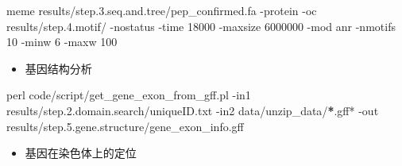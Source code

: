 \documentclass[
  10pt,
]{book}
\newenvironment{Shaded}{\begin{snugshade}}{\end{snugshade}}
\newcommand{\DecValTok}[1]{\textcolor[rgb]{0.00,0.00,0.81}{#1}}
\newcommand{\ErrorTok}[1]{\textcolor[rgb]{0.64,0.00,0.00}{\textbf{#1}}}
\newcommand{\FloatTok}[1]{\textcolor[rgb]{0.00,0.00,0.81}{#1}}
\newcommand{\NormalTok}[1]{#1}
\newcommand{\SpecialCharTok}[1]{\textcolor[rgb]{0.00,0.00,0.00}{#1}}
\providecommand{\tightlist}{%
  \setlength{\itemsep}{0pt}\setlength{\parskip}{0pt}}
\begin{document}
\begin{Shaded}
\begin{Highlighting}[]
\NormalTok{meme results}\SpecialCharTok{/}\NormalTok{step.}\FloatTok{3.}\NormalTok{seq.and.tree}\SpecialCharTok{/}\NormalTok{pep\_confirmed.fa }\SpecialCharTok{{-}}\NormalTok{protein }\SpecialCharTok{{-}}\NormalTok{oc results}\SpecialCharTok{/}\NormalTok{step.}\FloatTok{4.}\NormalTok{motif}\SpecialCharTok{/} \SpecialCharTok{{-}}\NormalTok{nostatus }\SpecialCharTok{{-}}\NormalTok{time }\DecValTok{18000} \SpecialCharTok{{-}}\NormalTok{maxsize }\DecValTok{6000000} \SpecialCharTok{{-}}\NormalTok{mod anr }\SpecialCharTok{{-}}\NormalTok{nmotifs }\DecValTok{10} \SpecialCharTok{{-}}\NormalTok{minw }\DecValTok{6} \SpecialCharTok{{-}}\NormalTok{maxw }\DecValTok{100}
\end{Highlighting}
\end{Shaded}

\begin{itemize}
\tightlist
\item
  基因结构分析
\end{itemize}

\begin{Shaded}
\begin{Highlighting}[]
\NormalTok{perl code}\SpecialCharTok{/}\NormalTok{script}\SpecialCharTok{/}\NormalTok{get\_gene\_exon\_from\_gff.pl }\SpecialCharTok{{-}}\NormalTok{in1 results}\SpecialCharTok{/}\NormalTok{step.}\FloatTok{2.}\NormalTok{domain.search}\SpecialCharTok{/}\NormalTok{uniqueID.txt }\SpecialCharTok{{-}}\NormalTok{in2 data}\SpecialCharTok{/}\NormalTok{unzip\_data}\SpecialCharTok{/}\ErrorTok{*}\NormalTok{.gff}\SpecialCharTok{*} \SpecialCharTok{{-}}\NormalTok{out results}\SpecialCharTok{/}\NormalTok{step.}\FloatTok{5.}\NormalTok{gene.structure}\SpecialCharTok{/}\NormalTok{gene\_exon\_info.gff}
\end{Highlighting}
\end{Shaded}

\begin{itemize}
\tightlist
\item
  基因在染色体上的定位
\end{itemize}
\end{document}
